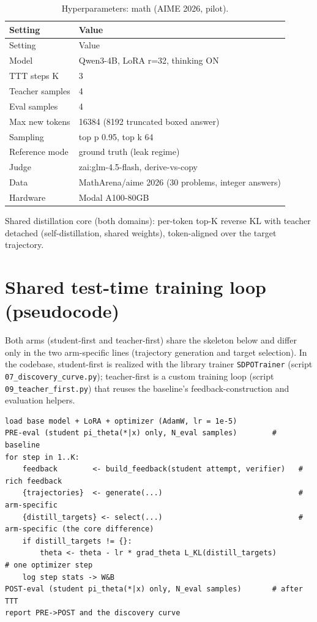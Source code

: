 \documentclass[12pt,a4paper]{report}
\begin{document}
\begin{longtable}{ll}
\caption{Hyperparameters: math (AIME 2026, pilot).}\\
\toprule
Setting & Value \\
\midrule
\endfirsthead
\toprule
Setting & Value \\
\midrule
\endhead
\bottomrule
\endfoot
Model & Qwen3-4B, LoRA r=32, thinking ON \\
TTT steps K & 3 \\
Teacher samples & 4 \\
Eval samples & 4 \\
Max new tokens & 16384 (8192 truncated boxed answer) \\
Sampling & top p 0.95, top k 64 \\
Reference mode & ground truth (leak regime) \\
Judge & zai:glm-4.5-flash, derive-vs-copy \\
Data & MathArena/aime 2026 (30 problems, integer answers) \\
Hardware & Modal A100-80GB \\
\end{longtable}

Shared distillation core (both domains): per-token top-K reverse KL with teacher detached (self-distillation, shared weights), token-aligned over the target trajectory.

\section{Shared test-time training loop (pseudocode)}\label{a.3-shared-ttt-loop}

{\sloppy Both arms (student-first and teacher-first) share the skeleton below and differ only in the two arm-specific lines (trajectory generation and target selection). In the codebase, student-first is realized with the library trainer \texttt{SDPOTrainer} (script \texttt{07\_discovery\_curve.py}); teacher-first is a custom training loop (script \texttt{09\_teacher\_first.py}) that reuses the baseline's feedback-construction and evaluation helpers.\par}

\begin{lstlisting}
load base model + LoRA + optimizer (AdamW, lr = 1e-5)
PRE-eval (student pi_theta(*|x) only, N_eval samples)        # baseline
for step in 1..K:
    feedback        <- build_feedback(student attempt, verifier)   # rich feedback
    {trajectories}  <- generate(...)                               # arm-specific
    {distill_targets} <- select(...)                               # arm-specific (the core difference)
    if distill_targets != {}:
        theta <- theta - lr * grad_theta L_KL(distill_targets)                    # one optimizer step
    log step stats -> W&B
POST-eval (student pi_theta(*|x) only, N_eval samples)       # after TTT
report PRE->POST and the discovery curve
\end{lstlisting}
\end{document}
